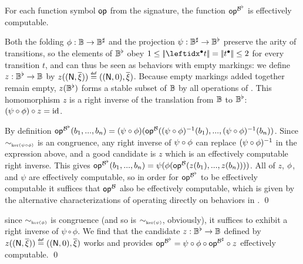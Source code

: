 \begin{propositionE}[][category=proofs]\label{prop:effective-finite-abstraction}
  For each function symbol $\mathsf{op}$ from the \hrtext{} signature, the
  function $\mathsf{op}^{{\mathcal{B}}^\flat}$ is effectively computable.
\end{propositionE}
\begin{proofE}
  Both the folding $\phi : \mathbb{B} \to {\mathbb{B}}^\sharp$
  and the projection $\psi : {\mathbb{B}}^\sharp \to {\mathbb{B}}^\flat$
  preserve the arity of transitions, so the elements of
  ${\mathbb{B}}^\flat$ obey $1 \leq \cardof{\pre{t}} = \cardof{\post{t}} \leq 2$
  for every transition $t$, and can thus be seen as behaviors with empty markings:
  we define $z : {\mathbb{B}}^\flat \to \mathbb{B}$ by
  $z((\mathsf{N},\overline{\xi})) \stackrel{\scriptscriptstyle{\mathsf{def}}}{=} ((\mathsf{N},0), \overline{\xi})$.
  Because empty markings added together remain empty,
  $z({\mathbb{B}}^\flat)$ forms a stable subset of $\mathbb{B}$
  by all operations of \hrtext{}.
  This homomorphism $z$ is a right inverse of the translation from
  $\mathbb{B}$ to ${\mathbb{B}}^\flat$: $(\psi\circ\phi) \circ z = \mathrm{id}$.

  By definition $\mathsf{op}^{{\mathcal{B}}^\flat}(b_1, ..., b_n) =
  (\psi\circ\phi)(\mathsf{op}^{\mathcal{B}}((\psi\circ\phi)^{-1}(b_1),...,(\psi\circ\phi)^{-1}(b_n))$.
  Since $\sim_{\scriptscriptstyle{\mathrm{ker}(\psi \circ \phi)}}$ is an \hrtext{} congruence, any right
  inverse of $\psi\circ\phi$ can replace $(\psi\circ\phi)^{-1}$ in
  the expression above, and a good candidate is $z$ which is an
  effectively computable right inverse.  This gives
  $\mathsf{op}^{{\mathcal{B}}^\flat}(b_1, ..., b_n) =
  \psi(\phi(\mathsf{op}^{\mathcal{B}}(z(b_1),...,z(b_n))))$.  All of $z$,
  $\phi$, and $\psi$ are effectively computable, so in order for
  $\mathsf{op}^{{\mathcal{B}}^\flat}$ to be effectively computable it
  suffices that $\mathsf{op}^{\mathcal{B}}$ also be effectively computable,
  which is given by the alternative characterizations of \hrtext{} operating
  directly on behaviors in .  \qed
\end{proofE}
\begin{proofSketch}
  since $\sim_{\scriptscriptstyle{\mathrm{ker}(\phi)}}$ is \hrtext{} congruence (and so is $\sim_{\scriptscriptstyle{\mathrm{ker}(\psi)}}$, obviously),
  it suffices to exhibit a right inverse of $\psi \circ \phi$.
  We find that the candidate $z : {\mathbb{B}}^\flat \to \mathbb{B}$
  defined by $z((\mathsf{N},\overline{\xi})) \stackrel{\scriptscriptstyle{\mathsf{def}}}{=} ((\mathsf{N},0), \overline{\xi})$
  works and provides $\mathsf{op}^{{\mathcal{B}}^\flat} = \psi \circ \phi \circ \mathsf{op}^{{\mathcal{B}}^\sharp} \circ z$
  effectively computable.
  \qed
\end{proofSketch}

